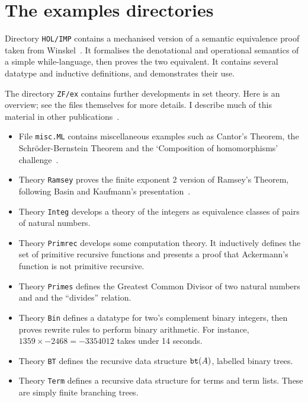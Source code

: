 \section{The examples directories}
Directory \texttt{HOL/IMP} contains a mechanised version of a semantic
equivalence proof taken from Winskel~\cite{winskel93}.  It formalises the
denotational and operational semantics of a simple while-language, then
proves the two equivalent.  It contains several datatype and inductive
definitions, and demonstrates their use.

The directory \texttt{ZF/ex} contains further developments in {\ZF} set
theory.  Here is an overview; see the files themselves for more details.  I
describe much of this material in other
publications~\cite{paulson-set-I,paulson-set-II,paulson-CADE}. 
\begin{itemize}
\item File \texttt{misc.ML} contains miscellaneous examples such as
  Cantor's Theorem, the Schr\"oder-Bernstein Theorem and the `Composition
  of homomorphisms' challenge~\cite{boyer86}.

\item Theory \texttt{Ramsey} proves the finite exponent 2 version of
  Ramsey's Theorem, following Basin and Kaufmann's
  presentation~\cite{basin91}.

\item Theory \texttt{Integ} develops a theory of the integers as
  equivalence classes of pairs of natural numbers.

\item Theory \texttt{Primrec} develops some computation theory.  It
  inductively defines the set of primitive recursive functions and presents a
  proof that Ackermann's function is not primitive recursive.

\item Theory \texttt{Primes} defines the Greatest Common Divisor of two
  natural numbers and and the ``divides'' relation.

\item Theory \texttt{Bin} defines a datatype for two's complement binary
  integers, then proves rewrite rules to perform binary arithmetic.  For
  instance, $1359\times {-}2468 = {-}3354012$ takes under 14 seconds.

\item Theory \texttt{BT} defines the recursive data structure ${\tt
    bt}(A)$, labelled binary trees.

\item Theory \texttt{Term} defines a recursive data structure for terms
  and term lists.  These are simply finite branching trees.


\end{itemize}
